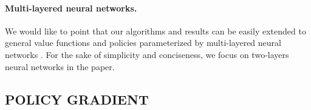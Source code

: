
\paragraph{Multi-layered neural networks.} We would like to point that our algorithms and results can be easily extended to general value functions and policies parameterized by multi-layered neural networks \citep{allen2018convergenceA,allen2018convergenceB,du2018gradientA}. For the sake of simplicity and conciseness, we focus on two-layers neural networks in the paper.



\subsection{POLICY GRADIENT}
\label{subsec:policy_gradient}

